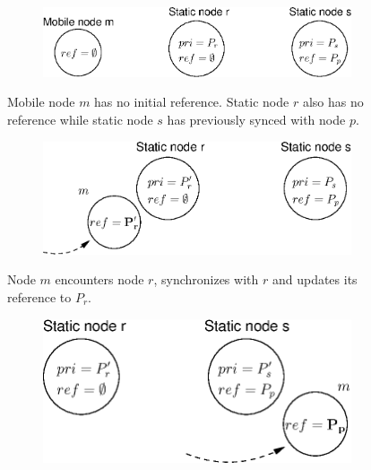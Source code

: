 \documentclass[twoside,twocolumn]{article}
\begin{document}
\begin{figure}[t]
   \centering
   \begin{subfigure}
       \centering
       \includegraphics[scale=0.55]{figs/illustration-1}
   \end{subfigure}
      \parbox{.8\columnwidth}
      {\smallskip\scriptsize
      Mobile node $m$ has no initial reference. Static node $r$ also
      has no reference while static node $s$ has previously
      synced with node $p$.\\}
  \begin{subfigure}
      \centering
      \includegraphics[scale=0.55]{figs/illustration-2}
  \end{subfigure}
      \parbox{.8\columnwidth}
      {\smallskip\scriptsize
      Node $m$ encounters node $r$, synchronizes with $r$ and
      updates its reference to $P_r$.\\}
  \begin{subfigure}
      \centering
      \includegraphics[scale=0.55]{figs/illustration-3}
  \end{subfigure}
      \parbox{.8\columnwidth}
      {\smallskip\scriptsize
}
\end{figure}
\end{document}
